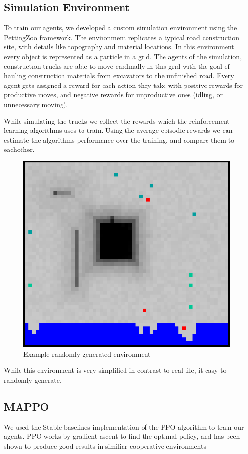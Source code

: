 \documentclass[conference]{IEEEtran}
\begin{document}
	\subsection{Simulation Environment}
	To train our agents, we developed a custom simulation environment using the PettingZoo framework. The environment replicates a typical road construction site, with details like topography and material locations. In this environment every object is represented as a particle in a grid.
	The agents of the simulation, construction trucks are able to move cardinally in this grid with the goal of hauling construction materials from excavators to the unfinished road.
	Every agent gets assigned a reward for each action they take with positive rewards for productive moves, and negative rewards for unproductive ones (idling, or unnecessary moving).

	While simulating the trucks we collect the rewards which the reinforcement learning algorithms uses to train.
	Using the average episodic rewards we can estimate the algorithms performance over the training, and compare them to eachother.
	\begin{figure}
		\includegraphics[width=0.9\columnwidth]{graphs/example_env.png}
		\caption{Example randomly generated environment}
	\end{figure}
	While this environment is very simplified in contrast to real life, it easy to randomly generate.

	\subsection{MAPPO}
	We used the Stable-baselines implementation of the PPO algorithm to train our agents.
	PPO works by gradient ascent to find the optimal policy, and has been shown to produce good results in similiar cooperative environments. %
\end{document}

